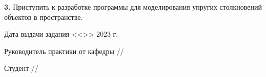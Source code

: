 \noindent \textbf{3.} Приступить к разработке программы для моделирования упругих столкновений объектов в пространстве.

\vfill

\noindent Дата выдачи задания <<>> 2023 г.

\vspace{1cm}



\noindent Руководитель практики от кафедры \hfill \ulinetext[2cm]{}{}//

\vspace{0.3cm}

\noindent Студент \hfill \ulinetext[2cm]{}{}//

\vfill

